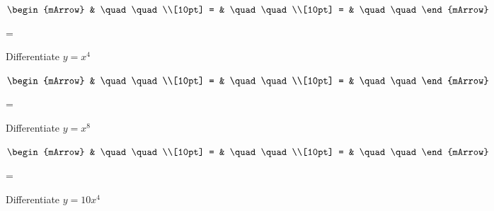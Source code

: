 \begin{mtask}
\begin{exercise}
\begin{envSolution}
             $\begin{mArrow}
                   & \quad \quad              \\[10pt]
		   		 = & \quad \quad              \\[10pt]
				 = & \quad \quad 
              \end{mArrow}$
            \begin{shortsolution}  
			     =$ \quad \quad \quad \quad$
			\end{shortsolution}				 
           \end{envSolution}
         \end{exercise}
	\task \begin{exercise} Differentiate $y=x^4$
           \begin{envSolution}
             $\begin{mArrow}
                   & \quad \quad              \\[10pt]
		   		 = & \quad \quad              \\[10pt]
				 = & \quad \quad 
              \end{mArrow}$
            \begin{shortsolution}  
			     =$ \quad \quad \quad \quad$
			\end{shortsolution}				 
           \end{envSolution}
         \end{exercise}
	\task \begin{exercise} Differentiate $y=x^8$
           \begin{envSolution}
             $\begin{mArrow}
                   & \quad \quad              \\[10pt]
		   		 = & \quad \quad              \\[10pt]
				 = & \quad \quad 
              \end{mArrow}$
            \begin{shortsolution}  
			     =$ \quad \quad \quad \quad$
			\end{shortsolution}				 
           \end{envSolution}
         \end{exercise}
	\task \begin{exercise} Differentiate $y=10x^4$
           \begin{envSolution}
             $\begin{mArrow}
                   & \quad \quad              \\[10pt]
		   		 = & \quad \quad              \\[10pt]

\end{mArrow}
\end{envSolution}
\end{exercise}
\end{mtask}
